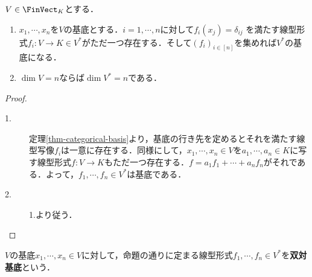 \documentclass[uplatex, dvipdfmx]{jsreport}
\begin{document}
\begin{proposition}[双対空間の次元]\label{prop-dimention-of-dual-space}
    $V\in\FinVect_K$とする．
    \begin{enumerate}
        \item $x_1,\cdots,x_n$を$V$の基底とする．$i=1,\cdots,n$に対して$f_i(x_j)=\delta_{ij}$
        を満たす線型形式$f_i:V\to K\in V^*$がただ一つ存在する．そして$(f_i)_{i\in[n]}$を集めれば$V^*$の基底になる．
        \item $\dim V=n$ならば$\dim V^*=n$である．
    \end{enumerate}
\end{proposition}
\begin{proof}\mbox{}
    \begin{description}
        \item[1.] 
        定理\ref{thm-categorical-basis}より，基底の行き先を定めるとそれを満たす線型写像$f_i$は一意に存在する．同様にして，$x_1,\cdots,x_n\in V$を$a_1,\cdots,a_n\in K$に写す線型形式$f:V\to K$もただ一つ存在する．$f=a_1f_1+\cdots+a_nf_n$がそれである．よって，$f_1,\cdots,f_n\in V^*$は基底である．
        \item[2.] 1.より従う．
    \end{description}
\end{proof}

\begin{definition}
    $V$の基底$x_1,\cdots,x_n\in V$に対して，命題の通りに定まる線型形式$f_1,\cdots,f_n\in V^*$を\textbf{双対基底}という．
\end{definition}
\end{document}
